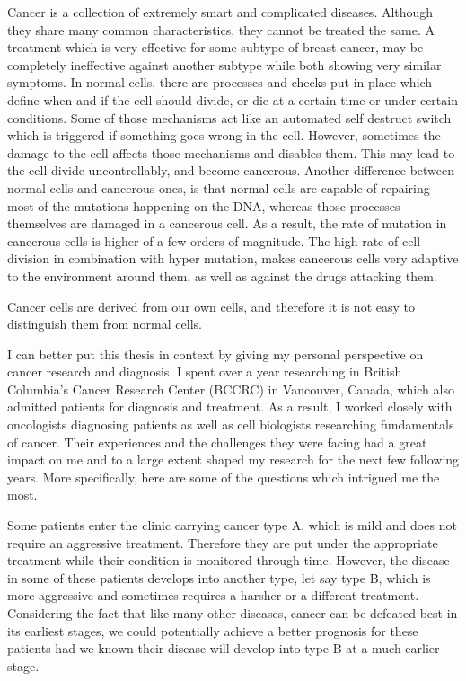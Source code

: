 Cancer is a collection of extremely smart and complicated diseases. Although
they share many common characteristics, they cannot be treated the same. A
treatment which is very effective for some subtype of breast cancer, may be
completely ineffective against another subtype while both showing very similar
symptoms. In normal cells, there are processes and checks put in place which
define when and if the cell should divide, or die at a certain time or under
certain conditions. Some of those mechanisms act like an automated self destruct
switch which is triggered if something goes wrong in the cell. However,
sometimes the damage to the cell affects those mechanisms and disables them.
This may lead to the cell divide uncontrollably, and become cancerous. Another
difference between normal cells and cancerous ones, is that normal cells are
capable of repairing most of the mutations happening on the DNA, whereas those
processes themselves are damaged in a cancerous cell. As a result, the rate of
mutation in cancerous cells is higher of a few orders of magnitude. The high
rate of cell division in combination with hyper mutation, makes cancerous cells
very adaptive to the environment around them, as well as against the drugs
attacking them.

Cancer cells are derived from our own cells, and therefore it is not easy to
distinguish them from normal cells.

I can better put this thesis in context by giving my personal perspective on
cancer research and diagnosis. I spent over a year researching in British
Columbia's Cancer Research Center (BCCRC) in Vancouver, Canada, which also
admitted patients for diagnosis and treatment. As a result, I worked closely
with oncologists diagnosing patients as well as cell biologists researching
fundamentals of cancer. Their experiences and the challenges they were facing
had a great impact on me and to a large extent shaped my research for the next
few following years. More specifically, here are some of the questions which
intrigued me the most.

Some patients enter the clinic carrying cancer type A, which is mild and does
not require an aggressive treatment. Therefore they are put under the
appropriate treatment while their condition is monitored through time. However,
the disease in some of these patients develops into another type, let say type
B, which is more aggressive and sometimes requires a harsher or a different
treatment. Considering the fact that like many other diseases, cancer can be
defeated best in its earliest stages, we could potentially achieve a
better prognosis for these patients had we known their disease will develop into
type B at a much earlier stage.

